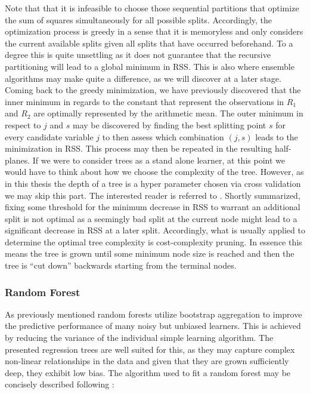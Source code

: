 \documentclass[a4paper,12pt, headsepline]{scrartcl}
\numberwithin{equation}{section}
\begin{document}
Note that that it is infeasible to choose those sequential partitions that optimize the sum of squares simultaneously for all possible splits. Accordingly, the optimization process is greedy in a sense that it is memoryless and only considers the current available splits given all splits that have occurred beforehand. To a degree this is quite unsettling as it does not guarantee that the recursive partitioning will lead to a global minimum in RSS. This is also where ensemble algorithms may make quite a difference, as we will discover at a later stage. Coming back to the greedy minimization, we have previously discovered that the inner minimum in regards to the constant that represent the observations in $R_1$ and $R_2$ are optimally represented by the arithmetic mean. The outer minimum in respect to $j$ and $s$ may be discovered by  finding the best splitting point $s$ for every candidate variable $j$ to then assess which combination $(j, s)$ leads to the minimization in RSS. This process may then be repeated in the resulting half-planes. If we were to consider trees as a stand alone learner, at this point we would have to think about how we choose the complexity of the tree. However, as in this thesis the depth of a tree is a hyper parameter chosen via cross validation we may skip this part. The interested reader is referred to \citet{hastie09}. Shortly summarized, fixing some threshold for the minimum decrease in RSS to warrant an additional split is not optimal as a seemingly bad split at the current node  might lead to a significant decrease in RSS at a later split. Accordingly, what is usually applied to determine the optimal tree complexity is cost-complexity pruning. In essence this means the tree is grown until some minimum node size is reached and then the tree is \enquote{cut down} backwards starting from the terminal nodes.

\subsubsection{Random Forest}\label{subsubsec:rf}
As previously mentioned random forests utilize bootstrap aggregation to improve the predictive performance of many noisy but unbiased learners. This is achieved by reducing the variance of the individual simple learning algorithm. The presented regression trees are well suited for this, as they may capture complex non-linear relationships in the data and given that they are grown sufficiently deep, they exhibit low bias. The algorithm used to fit a random forest may be concisely described following \citet{hastie09}:
\end{document}
